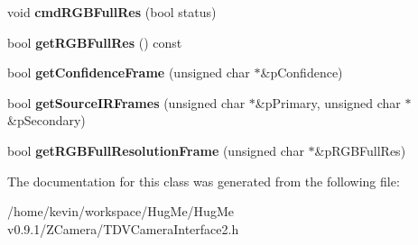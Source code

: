 \begin{DoxyCompactItemize}
\item 
\hypertarget{classTDVCameraInterfaceBase2_a8030d68df7c717b78af36d151cdf618f}{
void {\bfseries cmdRGBFullRes} (bool status)}
\label{classTDVCameraInterfaceBase2_a8030d68df7c717b78af36d151cdf618f}

\item 
\hypertarget{classTDVCameraInterfaceBase2_a49c8dd40ebb60cf565b6163dae3c5777}{
bool {\bfseries getRGBFullRes} () const }
\label{classTDVCameraInterfaceBase2_a49c8dd40ebb60cf565b6163dae3c5777}

\item 
\hypertarget{classTDVCameraInterfaceBase2_a41bafb7ada57dd229420462eb74e7e9a}{
bool {\bfseries getConfidenceFrame} (unsigned char $\ast$\&pConfidence)}
\label{classTDVCameraInterfaceBase2_a41bafb7ada57dd229420462eb74e7e9a}

\item 
\hypertarget{classTDVCameraInterfaceBase2_ad7be19b42aa545d68a03b742105fa5fd}{
bool {\bfseries getSourceIRFrames} (unsigned char $\ast$\&pPrimary, unsigned char $\ast$\&pSecondary)}
\label{classTDVCameraInterfaceBase2_ad7be19b42aa545d68a03b742105fa5fd}

\item 
\hypertarget{classTDVCameraInterfaceBase2_a559c0138bfc30147bdadbc765caa3e54}{
bool {\bfseries getRGBFullResolutionFrame} (unsigned char $\ast$\&pRGBFullRes)}
\label{classTDVCameraInterfaceBase2_a559c0138bfc30147bdadbc765caa3e54}

\end{DoxyCompactItemize}


The documentation for this class was generated from the following file:\begin{DoxyCompactItemize}
\item 
/home/kevin/workspace/HugMe/HugMe v0.9.1/ZCamera/TDVCameraInterface2.h\end{DoxyCompactItemize}
